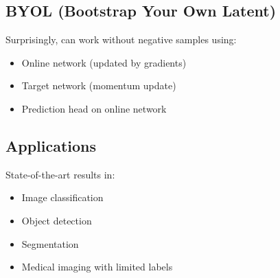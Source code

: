 \subsection{BYOL (Bootstrap Your Own Latent)}

Surprisingly, can work without negative samples using:
\begin{itemize}
    \item Online network (updated by gradients)
    \item Target network (momentum update)
    \item Prediction head on online network
\end{itemize}

\subsection{Applications}

State-of-the-art results in:
\begin{itemize}
    \item Image classification
    \item Object detection
    \item Segmentation
    \item Medical imaging with limited labels
\end{itemize}

